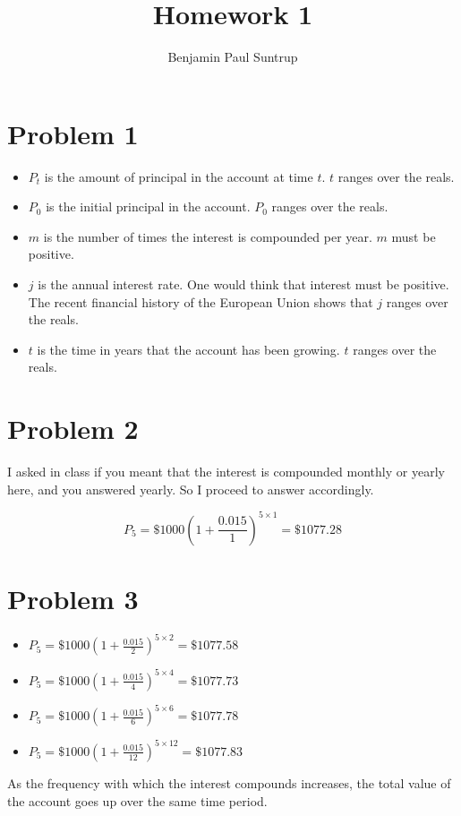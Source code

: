 \documentclass[12pt]{article}
\begin{document}
\title{Homework 1}
\author{Benjamin Paul Suntrup}
\maketitle
	
\section*{Problem 1}
\begin{itemize}
	\item $P_t$ is the amount of principal in the account at time $t$. $t$ ranges over the reals.
	\item $P_0$ is the initial principal in the account. $P_0$ ranges over the reals.
	\item $m$ is the number of times the interest is compounded per year. $m$ must be positive.
	\item $j$ is the annual interest rate. One would think that interest must be positive. The recent financial history of the European Union shows that $j$ ranges over the reals.
	\item $t$ is the time in years that the account has been growing. $t$ ranges over the reals.
\end{itemize}

\section*{Problem 2}
I asked in class if you meant that the interest is compounded monthly or yearly here, and you answered yearly. So I proceed to answer accordingly.

$$P_5 = \$1000(1+\frac{0.015}{1})^{5\times 1} = \$1077.28$$

\section*{Problem 3}
\begin{itemize}
	\item $P_5 = \$1000(1+\frac{0.015}{2})^{5\times 2} = \$1077.58$
	\item $P_5 = \$1000(1+\frac{0.015}{4})^{5\times 4} = \$1077.73$
	\item $P_5 = \$1000(1+\frac{0.015}{6})^{5\times 6} = \$1077.78$
	\item $P_5 = \$1000(1+\frac{0.015}{12})^{5\times 12} = \$1077.83$
\end{itemize}

As the frequency with which the interest compounds increases, the total value of the account goes up over the same time period.
\end{document}
